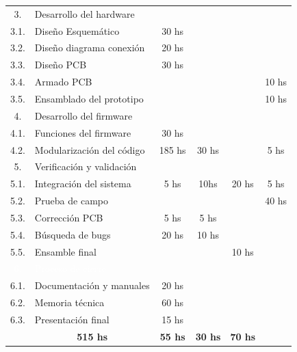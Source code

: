 \documentclass[11pt]{charter}
\begin{document}
\begin{table}[htpb]
\begin{tabularx}{\linewidth}{@{}|c|l|X|X|X|X|@{}}
 \rowcolor[HTML]{00D8FF}
 3. &
 \multicolumn{5}{|l|}{Desarrollo del hardware}	\\ \cline{1-6}
 
 3.1. &Diseño Esquemático &\multicolumn{1}{|c|}{30 hs} &  &  &  \\ \hline
 3.2. &Diseño diagrama conexión &\multicolumn{1}{|c|}{20 hs} &  &  &  \\ \hline
 3.3. &Diseño PCB  &\multicolumn{1}{|c|}{30 hs} &  &  &  \\ \hline
 3.4. &Armado PCB  &  &  &  &\multicolumn{1}{|c|}{10 hs}  \\ \hline
 3.5. &Ensamblado del prototipo  &  &  &  &\multicolumn{1}{|c|}{10 hs} \\ \hline
 
 \rowcolor[HTML]{FFD200}
 4. &
 \multicolumn{5}{|l|}{Desarrollo del firmware}\\ \cline{1-6}
 
 4.1. &Funciones del firmware  &\multicolumn{1}{|c|}{30 hs} &  &  &  \\ \hline
 4.2. &Modularización del código &\multicolumn{1}{|c|}{185 hs} &\multicolumn{1}{|c|}{30 hs}  &  &\multicolumn{1}{|c|}{5 hs}  \\ \hline
 
 \rowcolor[HTML]{00FF00}
 5. &
 \multicolumn{5}{|l|}{Verificación y validación}\\ \cline{1-6}
 
 5.1. &Integración del sistema  &\multicolumn{1}{|c|}{5 hs} &\multicolumn{1}{|c|}{10hs}  &\multicolumn{1}{|c|}{20 hs}  &\multicolumn{1}{|c|}{5 hs} \\ \hline
 5.2. &Prueba de campo  &  &  &  &\multicolumn{1}{|c|}{40 hs}  \\ \hline
 5.3. &Corrección PCB  &\multicolumn{1}{|c|}{5 hs} &\multicolumn{1}{|c|}{5 hs} &  &  \\ \hline
 5.4. &Búsqueda de bugs  &\multicolumn{1}{|c|}{20 hs} &\multicolumn{1}{|c|}{10 hs} &  &  \\ \hline
 5.5. &Ensamble final  &  &  &\multicolumn{1}{|c|}{10 hs} &  \\ \hline
 
 \rowcolor[HTML]{800080}
 \textcolor{white}{6. } &
 \multicolumn{5}{|l|}{\textcolor{white}{Proceso de cierre }}	\\ \cline{1-6} 
 
 6.1. &Documentación y manuales  &\multicolumn{1}{|c|}{20 hs} &  &  &  \\ \hline
 6.2. &Memoria técnica  &\multicolumn{1}{|c|}{60 hs} &  &  &  \\ \hline
 6.3. &Presentación final  &\multicolumn{1}{|c|}{15 hs} &  &  &  \\ \hline    

 \rowcolor[HTML]{C0C0C0}
 \multicolumn{2}{|c|}{\textbf{Totales }} &\multicolumn{1}{|c|}{\textbf{515 hs}}	&\multicolumn{1}{|c|}{\textbf{55 hs}}	&\multicolumn{1}{|c|}{\textbf{30 hs}}	&\multicolumn{1}{|c|}{\textbf{70 hs}}	\\ \cline{1-6}

\end{tabularx}
\end{table}
\end{document}
